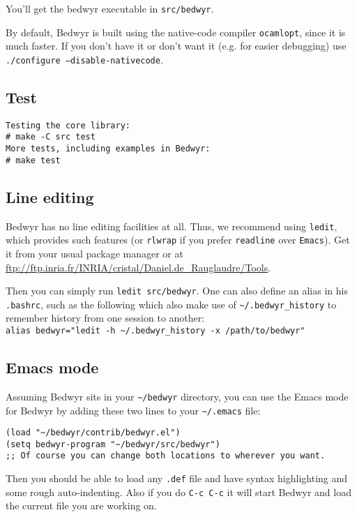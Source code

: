 \documentclass{article}
\begin{document}
You'll get the bedwyr executable in \texttt{src/bedwyr}.

By default, Bedwyr is built using the native-code compiler \texttt{ocamlopt},
since it is much faster. If you don't have it or don't want it (e.g.
for easier debugging) use \texttt{./configure --disable-nativecode}.

\subsection{Test}

\begin{verbatim}
Testing the core library:
# make -C src test
More tests, including examples in Bedwyr:
# make test
\end{verbatim}

\subsection{Line editing}

Bedwyr has no line editing facilities at all. Thus, we recommend using
\texttt{ledit}, which provides such features
(or \texttt{rlwrap} if you prefer \texttt{readline} over \texttt{Emacs}).
Get it from your usual package manager or at
\url{ftp://ftp.inria.fr/INRIA/cristal/Daniel.de_Rauglaudre/Tools}.

Then you can simply run \texttt{ledit src/bedwyr}. One can also define
an alias in his \verb;.bashrc;, such as the following which also
make use of \verb#~/.bedwyr_history# to remember history from one session to
another:\\
\verb|alias bedwyr="ledit -h ~/.bedwyr_history -x /path/to/bedwyr"|

\subsection{Emacs mode}

Assuming Bedwyr sits in your \verb.~/bedwyr. directory,
you can use the Emacs mode for Bedwyr by adding these two lines to your
\verb,~/.emacs, file:
\begin{verbatim}
(load "~/bedwyr/contrib/bedwyr.el")
(setq bedwyr-program "~/bedwyr/src/bedwyr")
;; Of course you can change both locations to wherever you want.
\end{verbatim}

Then you should be able to load any \verb:.def: file
and have syntax highlighting and some rough auto-indenting.
Also if you do \verb.C-c C-c. it will start Bedwyr
and load the current file you are working on.
\end{document}
